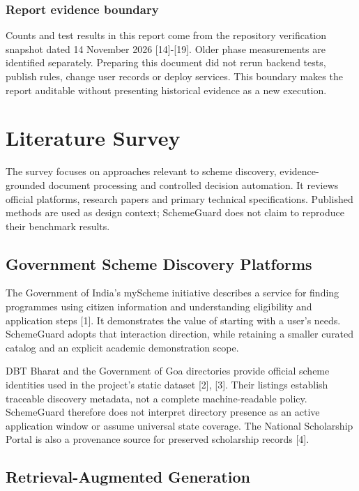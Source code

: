 \documentclass[12pt,a4paper,twoside]{report}
\begin{document}
\subsection*{Report evidence boundary}

Counts and test results in this report come from the repository verification snapshot dated 14 November 2026 [14]-[19]. Older phase measurements are identified separately. Preparing this document did not rerun backend tests, publish rules, change user records or deploy services. This boundary makes the report auditable without presenting historical evidence as a new execution.

\clearpage\chapter{Literature Survey}

The survey focuses on approaches relevant to scheme discovery, evidence-grounded document processing and controlled decision automation. It reviews official platforms, research papers and primary technical specifications. Published methods are used as design context; SchemeGuard does not claim to reproduce their benchmark results.

\section{Government Scheme Discovery Platforms}

The Government of India's myScheme initiative describes a service for finding programmes using citizen information and understanding eligibility and application steps [1]. It demonstrates the value of starting with a user's needs. SchemeGuard adopts that interaction direction, while retaining a smaller curated catalog and an explicit academic demonstration scope.

DBT Bharat and the Government of Goa directories provide official scheme identities used in the project's static dataset [2], [3]. Their listings establish traceable discovery metadata, not a complete machine-readable policy. SchemeGuard therefore does not interpret directory presence as an active application window or assume universal state coverage. The National Scholarship Portal is also a provenance source for preserved scholarship records [4].

\section{Retrieval-Augmented Generation}
\end{document}
